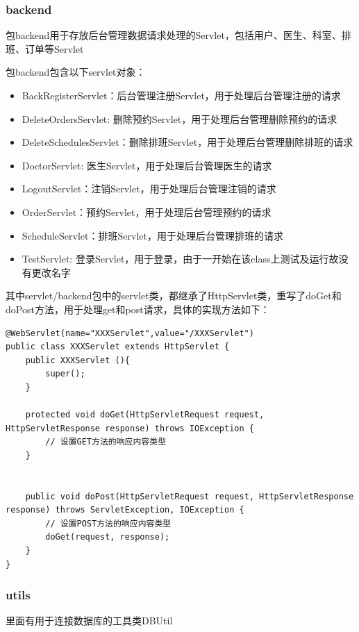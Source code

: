 \documentclass[UTF8,12pt]{article}
\begin{document}
\subsubsection{backend}
包backend用于存放后台管理数据请求处理的Servlet，包括用户、医生、科室、排班、订单等Servlet

包backend包含以下servlet对象：

\begin{itemize}
    \item BackRegisterServlet：后台管理注册Servlet，用于处理后台管理注册的请求
    \item DeleteOrdersServlet: 删除预约Servlet，用于处理后台管理删除预约的请求
    \item DeleteSchedulesServlet：删除排班Servlet，用于处理后台管理删除排班的请求
    \item DoctorServlet: 医生Servlet，用于处理后台管理医生的请求
    \item LogoutServlet：注销Servlet，用于处理后台管理注销的请求
    \item OrderServlet：预约Servlet，用于处理后台管理预约的请求
    \item ScheduleServlet：排班Servlet，用于处理后台管理排班的请求
    \item TestServlet: 登录Servlet，用于登录，由于一开始在该class上测试及运行故没有更改名字
\end{itemize}

其中servlet/backend包中的servlet类，都继承了HttpServlet类，重写了doGet和doPost方法，用于处理get和post请求，具体的实现方法如下：

\begin{lstlisting}[frame=shadowbox]
@WebServlet(name="XXXServlet",value="/XXXServlet")
public class XXXServlet extends HttpServlet {
    public XXXServlet (){
        super();
    }

    protected void doGet(HttpServletRequest request, HttpServletResponse response) throws IOException {
        // 设置GET方法的响应内容类型
    }


    public void doPost(HttpServletRequest request, HttpServletResponse response) throws ServletException, IOException {
        // 设置POST方法的响应内容类型
        doGet(request, response);
    }
}
\end{lstlisting}

\subsubsection{utils}
里面有用于连接数据库的工具类DBUtil
\end{document}
